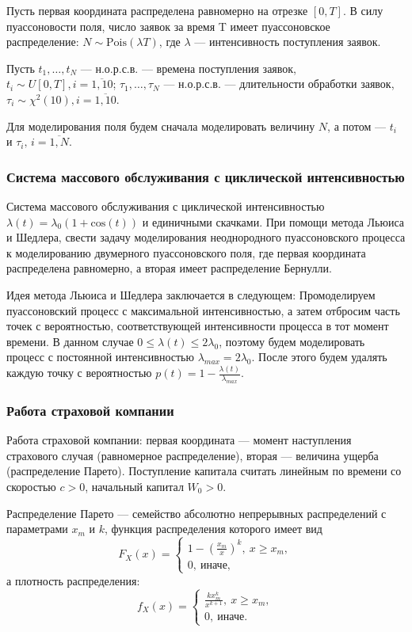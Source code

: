 \documentclass{article}
\theoremstyle{definition}
\begin{document}
Пусть первая координата распределена равномерно на отрезке $[0, T]$. В силу пуассоновости поля, число заявок за время T имеет пуассоновское распределение: $N \sim \text{Pois}(\lambda T)$, где $\lambda$ --- интенсивность поступления заявок.

Пусть $t_1, \dots, t_N$ --- н.о.р.с.в. --- времена поступления заявок, $t_i \sim U[0, T], i = \overline{1,10}$;  $\tau_1, \dots, \tau_N$ --- н.о.р.с.в. --- длительности обработки заявок, $\tau_i \sim \chi^2(10), i = \overline{1,10}$.

Для моделирования поля будем сначала моделировать величину $N$, а потом --- $t_i$ и $\tau_i,\, i = \overline{1,N}$.

\subsubsection{Система массового обслуживания с циклической интенсивностью}

Система массового обслуживания с циклической интенсивностью $\lambda(t) = \lambda_0(1 + \text{cos}(t))$ и единичными скачками. При помощи метода Льюиса и Шедлера, свести задачу моделирования неоднородного пуассоновского процесса к моделированию двумерного пуассоновского поля, где первая координата распределена равномерно, а вторая имеет распределение Бернулли.

Идея метода Льюиса и Шедлера заключается в следующем: Промоделируем пуассоновский процесс с максимальной интенсивностью, а затем отбросим часть точек с вероятностью, соответствующей интенсивности процесса в тот момент времени. В данном случае $0 \leqslant \lambda(t) \leqslant 2 \lambda_0$, поэтому будем моделировать процесс с постоянной интенсивностью $\lambda_{max} = 2 \lambda_0$. После этого будем удалять каждую точку с вероятностью $p(t) = 1 - \frac{\lambda(t)}{\lambda_{max}}$.

\subsubsection{Работа страховой компании}

Работа страховой компании: первая координата — момент наступления страхового случая (равномерное распределение), вторая — величина ущерба (распределение Парето). Поступление капитала считать линейным по времени со скоростью $c > 0$, начальный капитал $W_0 > 0$.

Распределение Парето --- семейство абсолютно непрерывных распределений с параметрами $x_m$ и $k$, функция распределения которого имеет вид
$$F_X(x) = \begin{cases} 1 - \left(\frac{x_m}{x}\right)^k,\ x \geqslant x_m, \\ 0,\ \text{иначе,}\end{cases}$$
а плотность распределения:
$$f_X(x) = \begin{cases} \frac{kx_m^k}{x^{k+1}},\ x \geqslant x_m, \\ 0,\ \text{иначе.}\end{cases}$$
\end{document}

